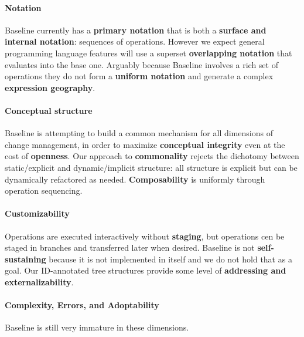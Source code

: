 \documentclass[english,submission]{programming}
\theoremstyle{definition}
\begin{document}
\paragraph{Notation} Baseline currently has a \textbf{primary notation} that is both a \textbf{surface and internal notation}: sequences of operations. However we expect general programming language features will use a superset \textbf{overlapping notation} that evaluates into the base one. Arguably because Baseline involves a rich set of operations they do not form a \textbf{uniform notation} and generate a complex \textbf{expression geography}.

\paragraph{Conceptual structure} Baseline is attempting to build a common mechanism for all dimensions of change management, in order to maximize \textbf{conceptual integrity} even at the cost of \textbf{openness}. Our approach to \textbf{commonality} rejects the  dichotomy between static/explicit and dynamic/implicit structure: all structure is explicit but can be dynamically refactored as needed. \textbf{Composability} is uniformly through operation sequencing.

\paragraph{Customizability} Operations are executed interactively without \textbf{staging}, but operations cen be staged in branches and transferred later when desired. Baseline is not \textbf{self-sustaining} because it is not implemented in itself and we do not hold that as a goal. Our ID-annotated tree structures provide some level of \textbf{addressing and externalizability}.

\paragraph{Complexity, Errors, and Adoptability} Baseline is still very immature in these dimensions.





\printbibliography
\end{document}
